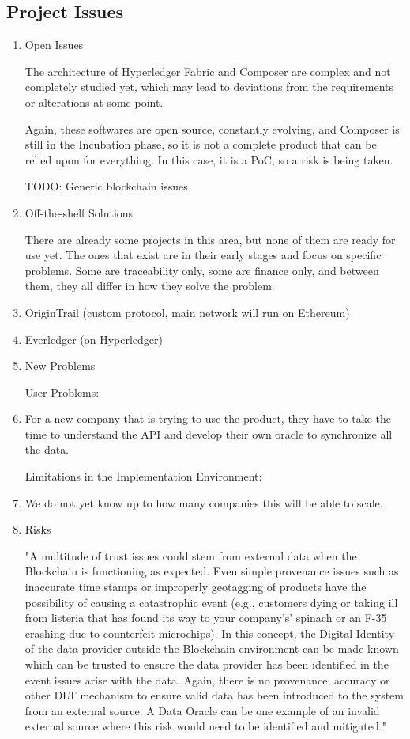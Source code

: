 \subsection*{Project Issues}
\begin{enumerate}
	\item Open Issues
		\par The architecture of Hyperledger Fabric and Composer are complex and not completely studied yet, which may lead to deviations from the requirements or alterations at some point.
		\par Again, these softwares are open source, constantly evolving, and Composer is still in the Incubation phase, so it is not a complete product that can be relied upon for everything. In this 
		case, it is a PoC, so a risk is being taken.
		\par TODO: Generic blockchain issues
	
    \item Off-the-shelf Solutions
		\par There are already some projects in this area, but none of them are ready for use yet. The ones that exist are in their early stages and focus on specific problems. Some are traceability only, some are finance only, and between them, they all differ in how they solve the problem.
			\item OriginTrail (custom protocol, main network will run on Ethereum)
			\item Everledger (on Hyperledger)
			
    \item New Problems
		\par User Problems: 
			\item For a new company that is trying to use the product, they have to take the time to understand the API and develop their own oracle to synchronize all the data. 
		\par Limitations in the Implementation Environment:
			\item We do not yet know up to how many companies this will be able to scale.
		
    \item Risks
		\par "A multitude of trust issues could stem from external data when the Blockchain is functioning as expected. Even simple provenance issues such as inaccurate time stamps or improperly geotagging of products have the possibility of causing a catastrophic event (e.g., customers dying or taking ill from listeria that has found its way to your company's’ spinach or an F-35 crashing due to counterfeit microchips). In this concept, the Digital Identity of the data provider outside the Blockchain environment can be made known which can be trusted to ensure the data provider has been identified in the event issues arise with the data. Again, there is no provenance, accuracy or other DLT mechanism to ensure valid data has been introduced to the system from an external source. A Data Oracle can be one example of an invalid external source where this risk would need to be identified and mitigated."
		

\end{enumerate}
